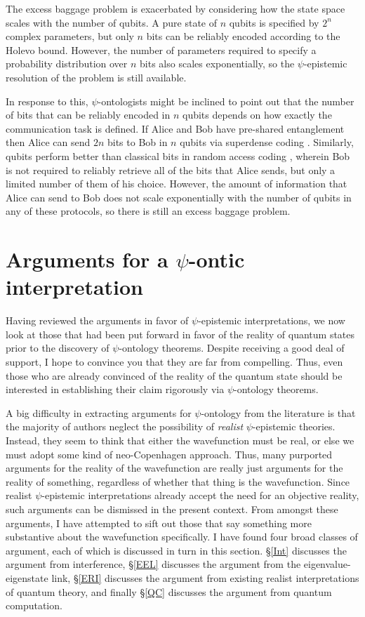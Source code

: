 \documentclass[DIV=calc,paper=a4,fontsize=11pt,twocolumn]{scrartcl} %
\theoremstyle{definition}
\theoremstyle{plain}
\begin{document}
The excess baggage problem is exacerbated by considering how the state
space scales with the number of qubits.  A pure state of $n$ qubits is
specified by $2^n$ complex parameters, but only $n$ bits can be
reliably encoded according to the Holevo bound.  However, the number
of parameters required to specify a probability distribution over $n$
bits also scales exponentially, so the $\psi$-epistemic resolution of
the problem is still available.

In response to this, $\psi$-ontologists might be inclined to point out
that the number of bits that can be reliably encoded in $n$ qubits
depends on how exactly the communication task is defined.  If Alice
and Bob have pre-shared entanglement then Alice can send $2n$ bits to
Bob in $n$ qubits via superdense coding \cite{Bennett1992}.
Similarly, qubits perform better than classical bits in random access
coding \cite{Ambainis1999}, wherein Bob is not required to reliably
retrieve all of the bits that Alice sends, but only a limited number
of them of his choice.  However, the amount of information that Alice
can send to Bob does not scale exponentially with the number of qubits
in any of these protocols, so there is still an excess baggage
problem.

\section{Arguments for a $\psi$-ontic interpretation}

\label{Ontic}

Having reviewed the arguments in favor of $\psi$-epistemic
interpretations, we now look at those that had been put forward in
favor of the reality of quantum states prior to the discovery of
$\psi$-ontology theorems.  Despite receiving a good deal of support, I
hope to convince you that they are far from compelling.  Thus, even
those who are already convinced of the reality of the quantum state
should be interested in establishing their claim rigorously via
$\psi$-ontology theorems.

A big difficulty in extracting arguments for $\psi$-ontology from the
literature is that the majority of authors neglect the possibility of
\emph{realist} $\psi$-epistemic theories.  Instead, they seem to think
that either the wavefunction must be real, or else we must adopt some
kind of neo-Copenhagen approach.  Thus, many purported arguments for
the reality of the wavefunction are really just arguments for the
reality of something, regardless of whether that thing is the
wavefunction.  Since realist $\psi$-epistemic interpretations already
accept the need for an objective reality, such arguments can be
dismissed in the present context.  From amongst these arguments, I
have attempted to sift out those that say something more substantive
about the wavefunction specifically.  I have found four broad classes
of argument, each of which is discussed in turn in this section.
\S\ref{Int} discusses the argument from interference, \S\ref{EEL}
discusses the argument from the eigenvalue-eigenstate link,
\S\ref{ERI} discusses the argument from existing realist
interpretations of quantum theory, and finally \S\ref{QC} discusses
the argument from quantum computation.
\end{document}
